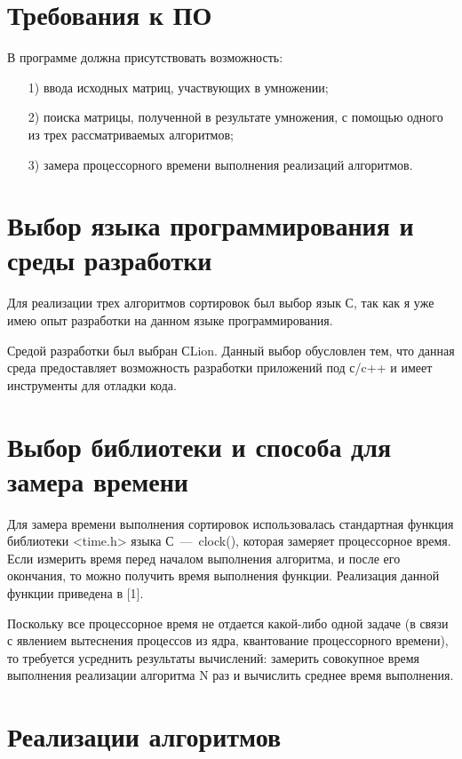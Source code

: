 \documentclass[12pt]{report}
\begin{document}
	\section{Требования к ПО}
	
	В программе должна присутствовать возможность:
	
	\begin{enumerate}
		\item[1)] ввода исходных матриц, участвующих в умножении;
		\item[2)] поиска матрицы, полученной в результате умножения, с помощью одного из трех рассматриваемых алгоритмов;
		\item[3)] замера процессорного времени выполнения реализаций алгоритмов.
	\end{enumerate}
	
	\section{Выбор языка программирования и среды разработки}
	
	Для реализации трех алгоритмов сортировок был выбор язык С, так как я уже имею опыт разработки на данном языке программирования.

	Средой разработки был выбран СLion. Данный выбор обусловлен тем, что данная среда предоставляет возможность разработки приложений под с/c++ и имеет инструменты для отладки кода. 
	
	\section{Выбор библиотеки и способа для замера времени}
		Для замера времени выполнения сортировок использовалась стандартная функция библиотеки <time.h> языка С~---~clock(), которая замеряет процессорное время. Если измерить время перед началом выполнения алгоритма, и после его окончания, то можно получить время выполнения функции. Реализация данной функции приведена в [1].
		
		Поскольку все процессорное время не отдается какой-либо одной задаче (в связи с явлением вытеснения процессов из ядра, квантование процессорного времени), то требуется усреднить результаты вычислений: замерить совокупное время выполнения реализации алгоритма N раз и вычислить среднее время выполнения.
		
	\section{Реализации алгоритмов}
	
\end{document}
